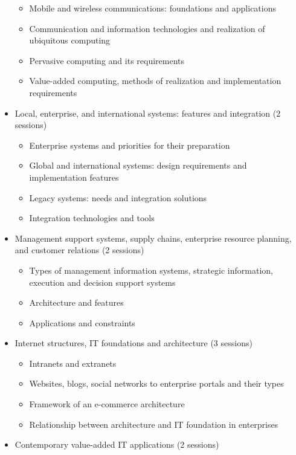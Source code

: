\documentclass[12pt]{article}
\begin{document}
\begin{itemize}
    \begin{itemize}
        \item Mobile and wireless communications: foundations and applications
        \item Communication and information technologies and realization of ubiquitous computing
        \item Pervasive computing and its requirements
        \item Value-added computing, methods of realization and implementation requirements
    \end{itemize}
    \item Local, enterprise, and international systems: features and integration (2 sessions)
    \begin{itemize}
        \item Enterprise systems and priorities for their preparation
        \item Global and international systems: design requirements and implementation features
        \item Legacy systems: needs and integration solutions
        \item Integration technologies and tools
    \end{itemize}
    \item Management support systems, supply chains, enterprise resource planning, and customer relations (2 sessions)
    \begin{itemize}
        \item Types of management information systems, strategic information, execution and decision support systems
        \item Architecture and features
        \item Applications and constraints
    \end{itemize}
    \item Internet structures, IT foundations and architecture (3 sessions)
    \begin{itemize}
        \item Intranets and extranets
        \item Websites, blogs, social networks to enterprise portals and their types
        \item Framework of an e-commerce architecture
        \item Relationship between architecture and IT foundation in enterprises
    \end{itemize}
    \item Contemporary value-added IT applications (2 sessions)

\end{itemize}
\end{document}
